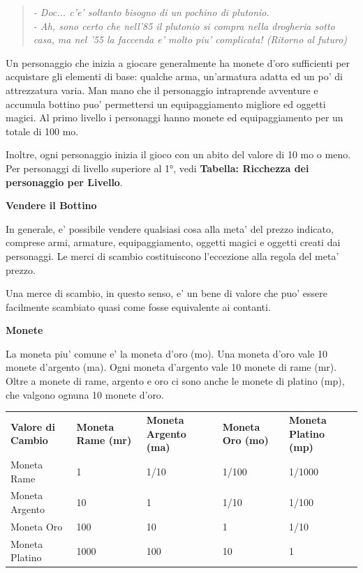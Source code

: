 \documentclass[a4paper,11pt,twoside,openany]{book}
\begin{document}
{\begin{quote}\textit{
- Doc... c'e' soltanto bisogno di un pochino di plutonio.\\
- Ah, sono certo che nell'85 il plutonio si compra nella drogheria sotto casa, ma nel '55 la faccenda e' molto piu' complicata! (Ritorno al futuro)
}\end{quote}


\label{ricchezza-e-denaro}

Un personaggio che inizia a giocare generalmente ha monete d'oro sufficienti per acquistare gli elementi di base: qualche arma, un'armatura adatta ed un po' di attrezzatura varia. Man mano che il personaggio intraprende avventure e accumula bottino puo' permettersi un equipaggiamento migliore ed oggetti magici. Al primo livello i personaggi hanno monete ed equipaggiamento per un totale di 100 mo.

Inoltre, ogni personaggio inizia il gioco con un abito del valore di 10 mo o meno. Per personaggi di livello superiore al 1°, vedi \textbf{Tabella: Ricchezza dei personaggio per Livello}.

\textbf{Vendere il Bottino}

In generale, e' possibile vendere qualsiasi cosa alla meta' del prezzo indicato, comprese armi, armature, equipaggiamento, oggetti magici e oggetti creati dai personaggi. Le merci di scambio costituiscono l'eccezione alla regola del meta' prezzo.

Una merce di scambio, in questo senso, e' un bene di valore che puo' essere facilmente scambiato quasi come fosse equivalente ai contanti.

\textbf{Monete}

La moneta piu' comune e' la moneta d'oro (mo). Una moneta d'oro vale 10 monete d'argento (ma). Ogni moneta d'argento vale 10 monete di rame (mr). Oltre a monete di rame, argento e oro ci sono anche le monete di platino (mp), che valgono ognuna 10 monete d'oro.

\begin{tabular}{L{3cm} L{3cm} L{3cm} L{3cm} L{3cm}}
\toprule
\textbf{Valore di Cambio} & \textbf{Moneta Rame (mr)} & \textbf{Moneta Argento (ma)} & \textbf{Moneta Oro (mo)} & \textbf{Moneta Platino (mp)}\tabularnewline
Moneta Rame & 1 & 1/10 & 1/100 & 1/1000\tabularnewline
Moneta Argento & 10 & 1 & 1/10 & 1/100\tabularnewline
Moneta Oro & 100 & 10 & 1 & 1/10\tabularnewline
Moneta Platino & 1000 & 100 & 10 & 1\tabularnewline
\end{tabular}

}
\end{document}
